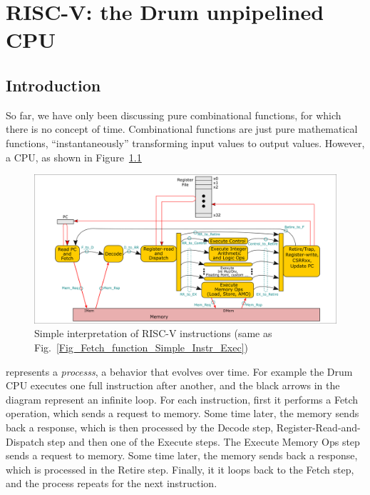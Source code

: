 

\chapter{RISC-V: the Drum unpipelined CPU}


\setcounter{page}{1}
\renewcommand{\thepage}{\arabic{chapter}-\arabic{page}}

\label{ch_Drum_code}


\section{Introduction}

So far, we have only been discussing pure combinational functions, for
which there is no concept of time.  Combinational functions are just
pure mathematical functions, ``instantaneously'' transforming input
values to output values.  However, a CPU, as shown in
Figure~\ref{Fig_Drum_Instr_Exec}
\begin{figure}[htbp]
  \centerline{\includegraphics[width=6in,angle=0]{Figures/Fig_Instr_Exec_w_structs}}
  \caption{\label{Fig_Drum_Instr_Exec}
           Simple interpretation of RISC-V instructions
	   (same as Fig.~\ref{Fig_Fetch_function_Simple_Instr_Exec})}
\end{figure}
represents a \emph{processs}, a behavior that evolves over time.  For
example the Drum CPU executes one full instruction after another, and
the black arrows in the diagram represent an infinite loop. For each
instruction, first it performs a Fetch operation, which sends a
request to memory. Some time later, the memory sends back a response,
which is then processed by the Decode step, Register-Read-and-Dispatch
step and then one of the Execute steps.  The Execute Memory Ops step
sends a request to memory. Some time later, the memory sends back a
response, which is processed in the Retire step.  Finally, it it loops
back to the Fetch step, and the process repeats for the next
instruction.

